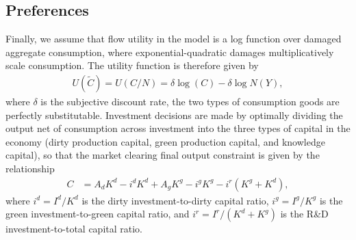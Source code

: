 \documentclass[12pt]{article}
\begin{document}



\subsection{Preferences}

Finally, we assume that flow utility in the model is a log function over damaged aggregate consumption, where exponential-quadratic damages multiplicatively scale consumption. The utility function is therefore given by
\begin{align*}
U(\tilde{C}) = U(C/N) = \delta\log(C)-\delta \log N(Y),
\end{align*}
where $\delta$ is the subjective discount rate, the two types of consumption goods are perfectly substitutable. Investment decisions are made by optimally dividing the output net of consumption across investment into the three types of capital in the economy (dirty production capital, green production capital, and knowledge capital), so that the market clearing final output constraint is given by the relationship
\begin{align*}
C & =A_{d}K^{d}-i^{d}K^{d}+A_{g}K^{g}-i^{g} K^{g}-i^{r} (K^g + K^d),
\end{align*}
where $i^{d} = I^{d}/K^{d}$ is the dirty investment-to-dirty capital ratio, $i^{g} = I^{g}/K^{g}$ is the green investment-to-green capital ratio, and $i^{r} = I^{r}/(K^d + K^g)$ is the R\&D investment-to-total capital ratio.
\end{document}
